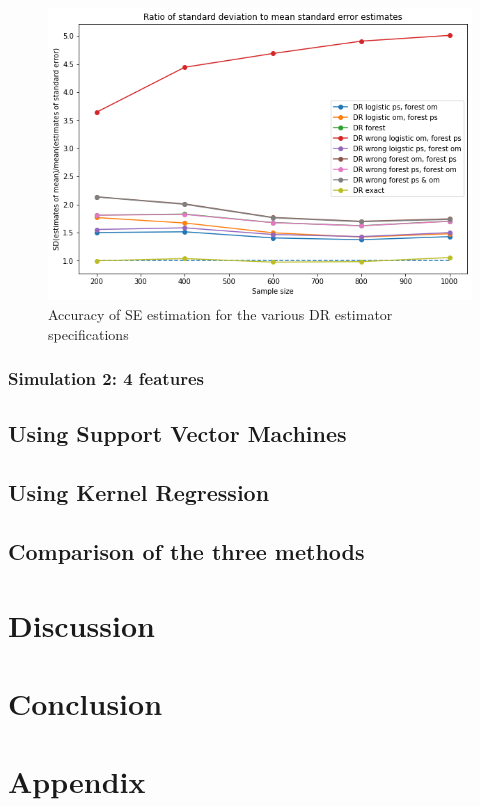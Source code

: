 \documentclass[12pt,twoside]{article}
\begin{document}
\begin{figure}[h!]
    \centering
    \includegraphics[width = 0.9\columnwidth]{figures/rf_2W_SE.png}
    \caption{Accuracy of \citet{lunceford_davidian} SE estimation for the various DR estimator specifications}
    \label{figSEpara}
\end{figure}

\subsubsection{Simulation 2: 4 features}

\subsection{Using Support Vector Machines}

\subsection{Using Kernel Regression}

\subsection{Comparison of the three methods}

\section{Discussion}

\section{Conclusion}

\section{Appendix}
\clearpage


\end{document}
